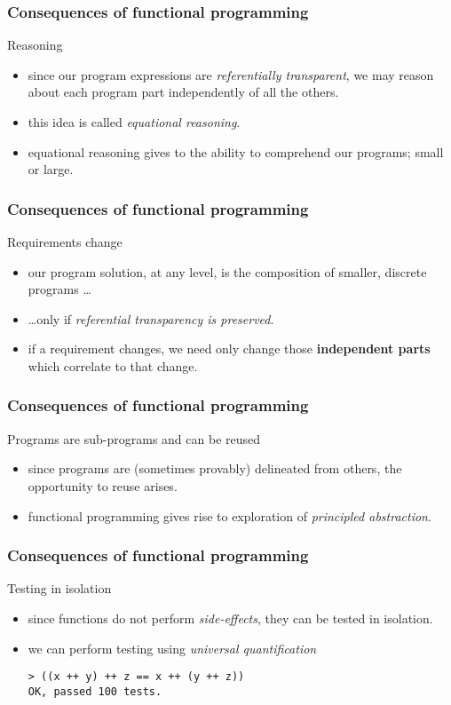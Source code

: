 \begin{frame}
\frametitle{Consequences of functional programming}
\begin{block}{Reasoning}
\begin{itemize}
\item<1-> since our program expressions are \emph{referentially transparent}, we may reason about each program part independently of all the others.
\item<2-> this idea is called \emph{equational reasoning}.
\item<3-> equational reasoning gives to the ability to comprehend our programs; small or large.
\end{itemize}
\end{block}
\end{frame}

\begin{frame}
\frametitle{Consequences of functional programming}
\begin{block}{Requirements change}
\begin{itemize}
\item<1-> our program solution, at any level, is the composition of smaller, discrete programs \ldots
\item<2-> \ldots only if \emph{referential transparency is preserved}.
\item<3-> if a requirement changes, we need only change those \textbf{independent parts} which correlate to that change.
\end{itemize}
\end{block}
\end{frame}

\begin{frame}
\frametitle{Consequences of functional programming}
\begin{block}{Programs are sub-programs and can be reused}
\begin{itemize}
\item<1-> since programs are (sometimes provably) delineated from others, the opportunity to reuse arises.
\item<2-> functional programming gives rise to exploration of \emph{principled abstraction}.
\end{itemize}
\end{block}
\end{frame}

\begin{frame}[fragile]
\frametitle{Consequences of functional programming}
\begin{block}{Testing in isolation}
\begin{itemize}
\item<1-> since functions do not perform \emph{side-effects}, they can be tested in isolation.
\item<2-> we can perform testing using \emph{universal quantification}
\begin{lstlisting}[style=haskell,mathescape,basicstyle=\scriptsize]
> ((x ++ y) ++ z == x ++ (y ++ z))
OK, passed 100 tests.
\end{lstlisting}
\end{itemize}
\end{block}
\end{frame}

